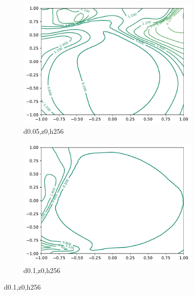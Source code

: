 \documentclass{article}
\begin{document}
\begin{figure}
\begin{subfigure}[b]{0.3\textwidth}
		\includegraphics[width=\textwidth]{report_images/d0.05_z0_h256_2D.pdf}
		\caption{d0.05,z0,h256}
    \end{subfigure}
    \begin{subfigure}[b]{0.3\textwidth}
        \centering
		\includegraphics[width=\textwidth]{report_images/d0.1_z0_h256_2D.pdf}
		\caption{d0.1,z0,h256}
    \end{subfigure}
    

\end{figure}
\end{document}
